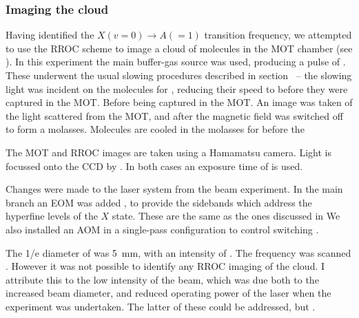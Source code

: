 \begin{figure}
  \centering
  \caption{}
  \label{exper:fig:beamresult}
\end{figure}

\subsubsection{Imaging the \CaF{} cloud}

Having identified the $X(v=0)\rightarrow A(=1)$ transition frequency, we
attempted to use the RROC scheme to image a cloud of \CaF{} molecules in the
MOT chamber (see ). In this experiment the main \CaF{}
buffer-gas source was used, producing a pulse of . These
underwent the usual slowing procedures described in section~ -- the slowing light was incident on the molecules for
, reducing their speed to  before they were captured in the
MOT. Before being captured in the MOT. An image was taken of the light
scattered from the MOT, and after the magnetic field was switched off
to form a molasses. Molecules are cooled in the molasses for  before
the 

The MOT and RROC images are taken using a Hamamatsu  camera. Light is
focussed onto the CCD by . In both cases
an exposure time of  is used.


\begin{figure}
  \centering
  \caption{}
  \label{exper:fig:laser}
\end{figure}

Changes were made to the laser system from the beam experiment.  In the main
branch an EOM was added , to provide
the sidebands which address the hyperfine levels of the $X$ state. These are
the same as the ones discussed in  We also
installed an AOM  in a single-pass configuration to control
switching .

The 1/e diameter of  was \SI{5}{\milli\meter}, with an intensity
of . The frequency was scanned . However
it was not possible to identify any RROC imaging of the cloud. I attribute this
to the low intensity of the  beam, which was due both to the
increased beam diameter, and reduced operating power of the laser when the
experiment was undertaken. The latter of these could be addressed, but .

